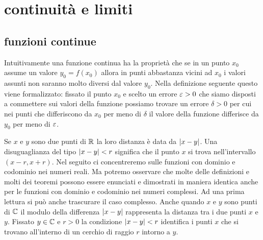 \chapter{continuità e limiti}
\label{ch:successioni}

\section{funzioni continue}
\label{sec:continuita}

Intuitivamente una funzione continua ha la proprietà
che se in un punto $x_0$ assume un valore $y_0=f(x_0)$ allora
in punti abbastanza vicini ad $x_0$ i valori assunti
non saranno molto diversi dal valore $y_0$.
Nella definizione seguente questo viene formalizzato:
fissato il punto $x_0$ e scelto un errore $\varepsilon>0$
che siamo disposti a commettere sui valori della funzione
possiamo trovare un errore $\delta>0$ per cui nei punti
che differiscono da $x_0$ per meno di $\delta$ il valore
della funzione differisce da $y_0$ per meno di $\varepsilon$.

Se $x$ e $y$ sono due punti di ${\mathbb R}$ la loro distanza 
è data da ${\left|x-y\right|}$. 
Una disuguaglianza del tipo ${\left|x-y\right|}<r$ significa 
che il punto $x$ si trova nell'intervallo $(x-r,x+r)$.
Nel seguito ci concentreremo sulle funzioni con dominio 
e codominio nei numeri reali. 
Ma potremo osservare che molte delle definizioni e molti 
dei teoremi possono essere enunciati e dimostrati in maniera 
identica anche per le funzioni con dominio e codominio 
nei numeri complessi. 
Ad una prima lettura si può anche trascurare 
il caso complesso.
%
%
Anche quando $x$ e $y$ sono punti di ${\mathbb C}$ il modulo della 
differenza ${\left|x-y\right|}$ rappresenta la distanza tra i due 
punti $x$ e $y$. 
Fissato $y\in {\mathbb C}$ e $r>0$
la condizione ${\left|x-y\right|}<r$ identifica i punti $x$ 
che si trovano all'interno di un cerchio di raggio $r$
intorno a $y$.

